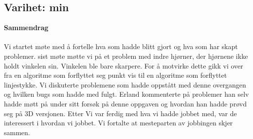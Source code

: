 \subsection*{\large Varihet:  min}
\textbf{\Large Sammendrag}\\ \\
Vi startet møte med å fortelle hva som hadde blitt gjort og hva som har skapt problemer. sist møte møtte vi på et problem med indre hjørner, der hjørnene ikke holdt vinkelen sin. Vinkelen ble bare skarpere. For å motvirke dette gikk vi over fra en algoritme som forflyttet seg punkt vis til en algoritme som forflyttet linjestykke. Vi diskuterte problemene som hadde oppstått med denne overgangen og hvilken bugs som hadde med fulgt. Erland kommenterte på problemer han selv hadde møtt på under sitt forsøk på denne oppgaven og hvordan han hadde prøvd seg på 3D versjonen. Etter Vi var ferdig med hva vi hadde jobbet med, var de interessert i hvordan vi jobbet. Vi fortalte at mesteparten av jobbingen skjer sammen.



